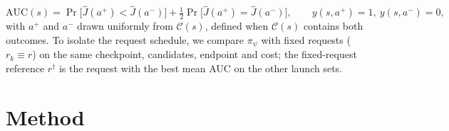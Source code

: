 \begin{equation}
\mathrm{AUC}(s)=\Pr\big[\hat J(a^{+})<\hat J(a^{-})\big]+\tfrac12\Pr\big[\hat J(a^{+})=\hat J(a^{-})\big],\qquad y(s,a^{+})=1,\ y(s,a^{-})=0,
\label{eq:auc}
\end{equation}
with $a^{+}$ and $a^{-}$ drawn uniformly from $\mathcal{C}(s)$, defined when $\mathcal{C}(s)$ contains both outcomes. To isolate the request schedule, we compare $\pi_\psi$ with fixed requests ($r_k\equiv r$) on the same checkpoint, candidates, endpoint and cost; the fixed-request reference $r^{\dagger}$ is the request with the best mean AUC on the other launch sets.

\section{Method}
\label{sec:mth:model}

